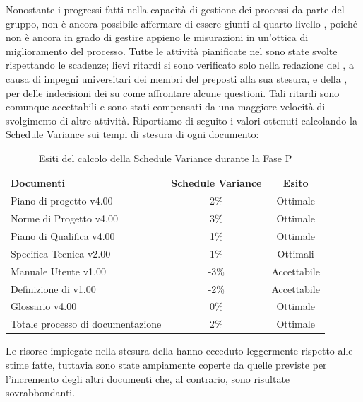 Nonostante i progressi fatti nella capacità di gestione dei processi da parte del gruppo, non è ancora possibile affermare di essere 
giunti al quarto livello , poiché non è ancora in grado di gestire appieno le misurazioni in un'ottica di miglioramento
del processo.
Tutte le attività pianificate nel  sono state svolte rispettando le scadenze; lievi ritardi si sono verificato 
solo nella redazione del , a causa di impegni universitari dei membri del  preposti alla sua stesura, e della 
, per delle indecisioni dei  su come affrontare alcune questioni. Tali ritardi sono 
comunque accettabili e sono stati compensati da una maggiore velocità di svolgimento di altre attività.
Riportiamo di seguito i valori ottenuti calcolando la Schedule Variance sui tempi di stesura di ogni documento:
			\begin{table}[H]
					\centering
					\begin{tabu}{| l | c | c |}
							\hline
							Documenti 							& Schedule Variance	& Esito		\\ \hline \hline
							
							Piano di progetto v4.00				& 2\% 		& Ottimale  \\ \hline
							Norme di Progetto v4.00 			& 3\%		& Ottimale  \\ \hline
							Piano di Qualifica v4.00 			& 1\%		& Ottimale  \\ \hline
							Specifica Tecnica v2.00 			& 1\%		& Ottimali  \\ \hline
							Manuale Utente v1.00 			& -3\%		& Accettabile  \\ \hline
							Definizione di  v1.00 			& -2\%		& Accettabile  \\ \hline
							Glossario v4.00					 	& 0\% 		& Ottimale  \\ \hline
							Totale processo di documentazione & 2\% & Ottimale \\ \hline
						\end{tabu}
					\caption{Esiti del calcolo della Schedule Variance durante la Fase P}
				\end{table}
Le risorse impiegate nella stesura della  hanno ecceduto leggermente rispetto alle stime fatte, tuttavia sono state ampiamente coperte 
da quelle previste per l'incremento degli altri documenti che, al contrario, sono risultate sovrabbondanti.
